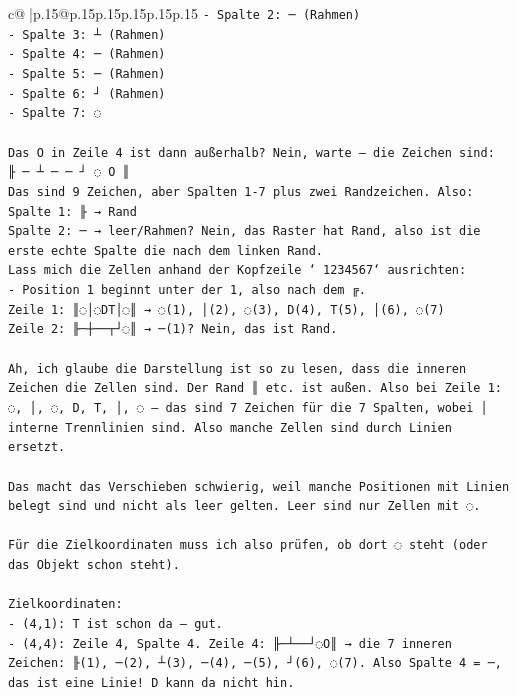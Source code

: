 \documentclass{article}
\begin{document}
{\begin{supertabular}{c@{$\;$}|p{.15\linewidth}@{}p{.15\linewidth}p{.15\linewidth}p{.15\linewidth}p{.15\linewidth}p{.15\linewidth}}
{{{\texttt{{-} Spalte 2: ─ (Rahmen)} \\
\texttt{{-} Spalte 3: ┴ (Rahmen)} \\
\texttt{{-} Spalte 4: ─ (Rahmen)} \\
\texttt{{-} Spalte 5: ─ (Rahmen)} \\
\texttt{{-} Spalte 6: ┘ (Rahmen)} \\
\texttt{{-} Spalte 7: ◌} \\
\\ 
\texttt{Das O in Zeile 4 ist dann außerhalb? Nein, warte – die Zeichen sind:} \\
\texttt{╟ ─ ┴ ─ ─ ┘ ◌ O ║} \\
\texttt{Das sind 9 Zeichen, aber Spalten 1{-}7 plus zwei Randzeichen. Also:} \\
\texttt{Spalte 1: ╟ → Rand} \\
\texttt{Spalte 2: ─ → leer/Rahmen? Nein, das Raster hat Rand, also ist die erste echte Spalte die nach dem linken Rand.} \\
\texttt{Lass mich die Zellen anhand der Kopfzeile ` 1234567` ausrichten:} \\
\texttt{{-} Position 1 beginnt unter der 1, also nach dem ╔. } \\
\texttt{Zeile 1: ║◌│◌DT│◌║ → ◌(1), │(2), ◌(3), D(4), T(5), │(6), ◌(7)} \\
\texttt{Zeile 2: ╟─┼──┬┘◌║ → ─(1)? Nein, das ist Rand.} \\
\\ 
\texttt{Ah, ich glaube die Darstellung ist so zu lesen, dass die inneren Zeichen die Zellen sind. Der Rand ║ etc. ist außen. Also bei Zeile 1: ◌, │, ◌, D, T, │, ◌ – das sind 7 Zeichen für die 7 Spalten, wobei │ interne Trennlinien sind. Also manche Zellen sind durch Linien ersetzt.} \\
\\ 
\texttt{Das macht das Verschieben schwierig, weil manche Positionen mit Linien belegt sind und nicht als leer gelten. Leer sind nur Zellen mit ◌.} \\
\\ 
\texttt{Für die Zielkoordinaten muss ich also prüfen, ob dort ◌ steht (oder das Objekt schon steht).} \\
\\ 
\texttt{Zielkoordinaten:} \\
\texttt{{-} (4,1): T ist schon da – gut.} \\
\texttt{{-} (4,4): Zeile 4, Spalte 4. Zeile 4: ╟─┴──┘◌O║ → die 7 inneren Zeichen: ╟(1), ─(2), ┴(3), ─(4), ─(5), ┘(6), ◌(7). Also Spalte 4 = ─, das ist eine Linie! D kann da nicht hin.} \\
}}}
\end{supertabular}}
\end{document}
